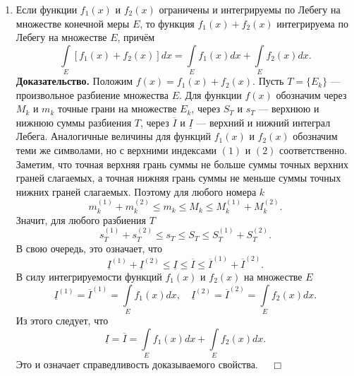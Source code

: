 \documentclass[12pt,a4paper, titlepage]{article}
\begin{document}
\begin{enumerate}
\item Если функции $f_1(x)$ и $f_2(x)$ ограничены и интегрируемы по Лебегу на множестве конечной меры $E$, то функция $f_1(x) + f_2(x)$ интегрируема по Лебегу на множестве $E$, причём
$$
\int\limits_E [f_1(x) + f_2(x)] dx = \int\limits_E f_1(x) dx + \int\limits_E f_2(x) dx.
$$
\textbf{Доказательство.} Положим $f(x) = f_1(x) + f_2(x)$. Пусть $T = \lbrace E_k \rbrace$ --- произвольное разбиение множества $E$. Для функции $f(x)$ обозначим через $M_k$ и $m_k$ точные грани на множестве $E_k$, через $S_T$ и $s_T$ --- верхнюю и нижнюю суммы разбиения $T$, через $\overline{I}$ и $\underline{I}$ --- верхний и нижний интеграл Лебега. Аналогичные величины для функций $f_1(x)$ и $f_2(x)$ обозначим теми же символами, но с верхними индексами $(1)$ и $(2)$ соответственно.\\

Заметим, что точная верхняя грань суммы не больше суммы точных верхних граней слагаемых, а точная нижняя грань суммы не меньше суммы точных нижних граней слагаемых. Поэтому для любого номера $k$
$$
m_k^{(1)} + m_k^{(2)} \leqslant m_k \leqslant M_k \leqslant M_k^{(1)} + M_k^{(2)}.
$$
Значит, для любого разбиения $T$
$$
s_T^{(1)} + s_T^{(2)} \leqslant s_T \leqslant S_T \leqslant S_T^{(1)} + S_T^{(2)}.
$$
В свою очередь, это означает, что
$$
\underline{I}^{(1)} + \underline{I}^{(2)} \leqslant \underline{I} \leqslant \overline{I} \leqslant \overline{I}^{(1)} + \overline{I}^{(2)}.
$$
В силу интегрируемости функций $f_1(x)$ и $f_2(x)$ на множестве $E$
$$
\underline{I}^{(1)} = \overline{I}^{(1)} = \int\limits_E f_1(x) dx, \quad \underline{I}^{(2)} = \overline{I}^{(2)} = \int\limits_E f_2(x) dx.
$$
Из этого следует, что
$$
\underline{I} = \overline{I} = \int\limits_E f_1(x) dx + \int\limits_E f_2(x) dx.
$$
Это и означает справедливость доказываемого свойства. $\quad \Box$\\


\end{enumerate}
\end{document}
